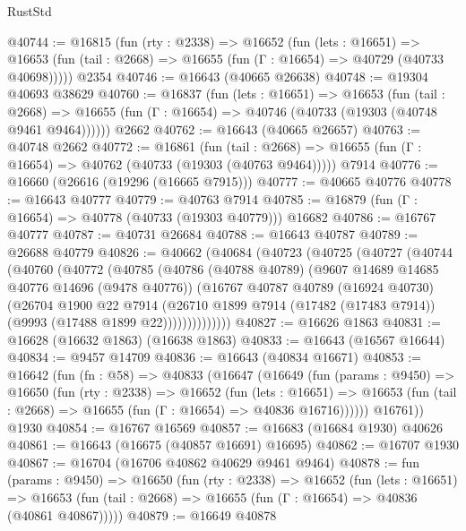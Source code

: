 \begin{lexlean}{RustStd}
\begin{coremodule}
@40744 := @16815
    (fun (rty : @2338) =>
    @16652
      (fun (lets : @16651) =>
      @16653 (fun (tail : @2668) => @16655 (fun (Γ : @16654) => @40729 (@40733 @40698)))))
    @2354
@40746 := @16643 (@40665 @26638)
@40748 := @19304 @40693 @38629
@40760 := @16837
    (fun (lets : @16651) =>
    @16653
      (fun (tail : @2668) =>
      @16655 (fun (Γ : @16654) => @40746 (@40733 (@19303 (@40748 @9461 @9464))))))
    @2662
@40762 := @16643 (@40665 @26657)
@40763 := @40748 @2662
@40772 := @16861
    (fun (tail : @2668) => @16655 (fun (Γ : @16654) => @40762 (@40733 (@19303 (@40763 @9464)))))
    @7914
@40776 := @16660 (@26616 (@19296 (@16665 @7915)))
@40777 := @40665 @40776
@40778 := @16643 @40777
@40779 := @40763 @7914
@40785 := @16879 (fun (Γ : @16654) => @40778 (@40733 (@19303 @40779))) @16682
@40786 := @16767 @40777
@40787 := @40731 @26684
@40788 := @16643 @40787
@40789 := @26688 @40779
@40826 := @40662
    (@40684
      (@40723
        (@40725
          (@40727
            (@40744
              (@40760
                (@40772
                  (@40785
                    (@40786
                      (@40788 @40789)
                      (@9607 @14689 @14685 @40776 @14696 (@9478 @40776))
                      (@16767
                        @40787
                        @40789
                        (@16924 @40730)
                        (@26704
                          @1900
                          @22
                          @7914
                          (@26710
                            @1899
                            @7914
                            (@17482 (@17483 @7914))
                            (@9993 (@17488 @1899 @22))))))))))))))
@40827 := @16626 @1863
@40831 := @16628 (@16632 @1863) (@16638 @1863)
@40833 := @16643 (@16567 @16644)
@40834 := @9457 @14709
@40836 := @16643 (@40834 @16671)
@40853 := @16642
    (fun (fn : @58) =>
    @40833
      (@16647
        (@16649
          (fun (params : @9450) =>
          @16650
            (fun (rty : @2338) =>
            @16652
              (fun (lets : @16651) =>
              @16653 (fun (tail : @2668) => @16655 (fun (Γ : @16654) => @40836 @16716))))))
        @16761))
    @1930
@40854 := @16767 @16569
@40857 := @16683 (@16684 @1930) @40626
@40861 := @16643 (@16675 (@40857 @16691) @16695)
@40862 := @16707 @1930
@40867 := @16704 (@16706 @40862 @40629 @9461 @9464)
@40878 := fun (params : @9450) =>
  @16650
    (fun (rty : @2338) =>
    @16652
      (fun (lets : @16651) =>
      @16653 (fun (tail : @2668) => @16655 (fun (Γ : @16654) => @40836 (@40861 @40867)))))
@40879 := @16649 @40878

\end{coremodule}
\end{lexlean}

